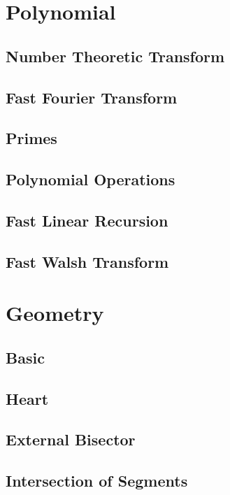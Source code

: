 \section{Polynomial}
\subsection{Number Theoretic Transform}

\subsection{Fast Fourier Transform}

\subsection{Primes}

\subsection{Polynomial Operations}

\subsection{Fast Linear Recursion}

\subsection{Fast Walsh Transform}


\section{Geometry}
\subsection{Basic}

\subsection{Heart}

\subsection{External Bisector}

\subsection{Intersection of Segments}

